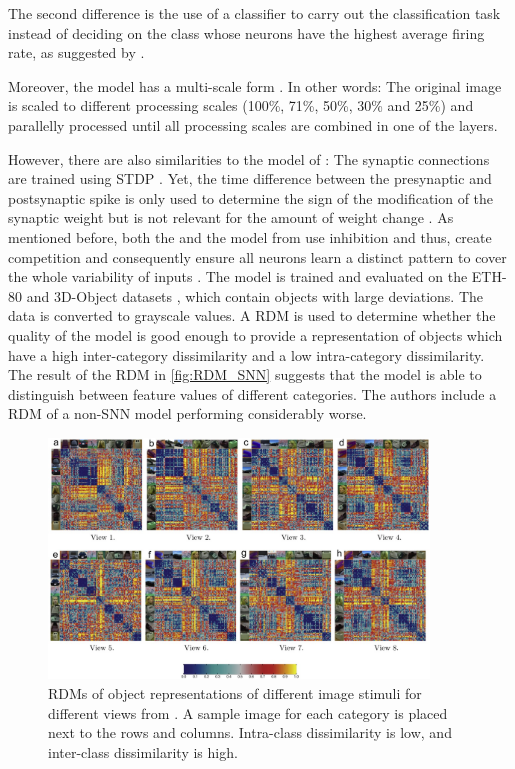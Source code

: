 The second difference is the use of a classifier to carry out the classification task 
instead of deciding on the class whose neurons have the highest average firing rate, 
as suggested by \authorsSNN{} \cite{SNN}.

Moreover, the model has a multi-scale form \cite{multi_scale_STDP}.
In other words: 
The original image is scaled to different processing scales (100\%, 71\%, 50\%, 30\% and 25\%) and parallelly processed until 
all processing scales are combined in one of the layers.

However, there are also similarities to the model of \authorsSNN{} \cite{SNN}:
The synaptic connections are trained using \ac{STDP} \cite{multi_scale_STDP,STDP_vis_feat}.
Yet, the time difference between the presynaptic and postsynaptic spike is only used to determine the sign of the modification of the synaptic weight 
but is not relevant for the amount of weight change \cite{STDP_vis_feat}.
As mentioned before, both the \cite{multi_scale_STDP} and the model from \authorsSNN{} \cite{SNN} use inhibition and thus, 
create competition and consequently ensure all neurons learn a distinct pattern to cover the whole variability of inputs \cite{STDP_vis_feat}.
%
The \cite{multi_scale_STDP} model is trained and evaluated on the ETH-80 and 3D-Object datasets \cite{multi_scale_STDP}, which contain objects with large deviations.
The data is converted to grayscale values.
A \ac{RDM} is used to determine whether the quality of the model is good enough to provide a representation of objects which have a high inter-category dissimilarity and a low intra-category dissimilarity.
The result of the \ac{RDM} in \autoref{fig:RDM_SNN} suggests that the model is able to distinguish between feature values of different categories.
The authors include a \ac{RDM} of a non-\ac{SNN} model performing considerably worse.
%
\begin{figure}[htbp]
    \center
    \includegraphics[width=0.9\textwidth]{pictures/inter_intra_category_dissimilarity.jpg}
    \caption{\acp{RDM} of object representations of different image stimuli for different views from \cite{multi_scale_STDP}.
    A sample image for each category is placed next to the rows and columns.
    Intra-class dissimilarity is low, and inter-class dissimilarity is high.}
    \label{fig:RDM_SNN}
\end{figure}
